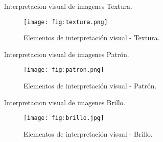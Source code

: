 \begin{frame}{}
    \begin{block}{Interpretacion visual de imagenes}
      Textura.

    \end{block}
\end{frame}


\begin{frame}{}
  \begin{figure}
    \centering
    \texttt{[image: fig:textura.png]}
    \caption{Elementos de interpretación visual - Textura.}
    \label{}
  \end{figure}
\end{frame}


\begin{frame}{}
    \begin{block}{Interpretacion visual de imagenes}
      Patrón.

    \end{block}
\end{frame}


\begin{frame}{}
  \begin{figure}
    \centering
    \texttt{[image: fig:patron.png]}
    \caption{Elementos de interpretación visual - Patrón.}
    \label{}
  \end{figure}
\end{frame}

\begin{frame}{}
    \begin{block}{Interpretacion visual de imagenes}
      Brillo.

    \end{block}
\end{frame}




\begin{frame}{}
  \begin{figure}
    \centering
    \texttt{[image: fig:brillo.jpg]}
    \caption{Elementos de interpretación visual - Brillo.}
    \label{}
  \end{figure}
\end{frame}



